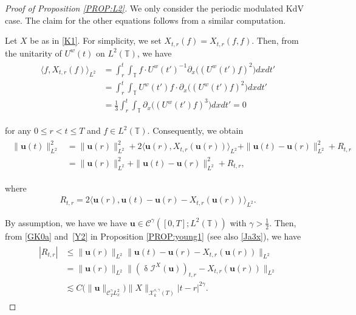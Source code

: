 \documentclass[letterpaper, 11pt,  reqno]{amsart}
\newcommand{\1}{\hspace{0.5mm}\text{I}\hspace{0.5mm}}
\newcommand{\I}{\mathcal{I}}
\newcommand{\noi}{\noindent}
\newcommand{\T}{\mathbb{T}}
\newcommand{\CC}{\mathcal{C}}
\newcommand{\updl}{\updelta}
\newcommand{\g}{\gamma}
\newcommand{\dx}{\partial_x}
\newcommand{\les}{\lesssim}
\newcommand{\jb}[1]
{\langle #1 \rangle}
\newcommand{\cX}{\mathcal{X}}
\newcommand{\uw}{U^w}
\newcommand{\uu}{\mathbf{u}}
\numberwithin{equation}{section}
\numberwithin{theorem}{section}
\begin{document}
\begin{proof}[Proof of Proposition \ref{PROP:L2}]

We only consider the periodic modulated KdV case.
The claim for the other equations follows 
from a similar computation.


Let $X$ be as in 
\eqref{K1}.
For simplicity, we set $X_{t, r}(f) = X_{t, r}(f, f)$.
Then, 
from the unitarity of $\uw(t)$ on $L^2(\T)$, 
we have 
\begin{align}
\begin{split}
\jb{f, X_{t,r}(f)  }_{L^2}
&=\int_{r}^{t} 
\int_{\T}  f\cdot 
 \uw(t')^{-1}  
\dx \big((\uw(t') f)^2 \big) 
dx  dt'\\
&=\int_{r}^{t}
 \int_{\T}   \uw(t')  f \cdot 
  \dx \big((\uw(t') f)^2\big)   dxdt'
\\&=\frac 13 \int_{r}^{t} \int_{\T}
  \dx \big((\uw(t') f)^3\big)
   dx dt'=0
\end{split}
\label{GK0}
\end{align}


\noi
for any  $0\leq r<t\leq T$ and $f \in L^2(\T)$.
Consequently,
we obtain 
\begin{align}
\label{GK1}
\begin{aligned}
\| \uu(t) \|^2_{L^2}
&=\|  \uu(r)  \|_{L^2}^2
+2\big\langle \uu(r),X_{t,r}(\uu(r)) 
\big\rangle_{L^2}
 +  \|  \uu(t) -\uu(r)  \|^2_{L^2}+R_{t,r}\\
&=\|  \uu(r)  \|^2_{L^2} +
\|   \uu(t)-\uu(r)   \|^2_{L^2}
+R_{t,r},
\end{aligned}
\end{align}



\noi
where 
\begin{align*}
R_{t,r}=2\big\langle 
\uu(r) ,  \uu(t)-  \uu(r) -X_{t,r}(\uu(r))\big\rangle_{L^2}. 
\end{align*}


\noi
By assumption, we have 
we have 
 $\uu\in \CC^\g([0, T];  L^2(\T))$
with $\g>\frac 12$. 
Then, 
from \eqref{GK0a} and~\eqref{Y2} in Proposition \ref{PROP:young1}
(see also \eqref{Ja3x}), 
we have 
\begin{align}
\begin{split}
|R_{t,r}| 
&\leq 
\|\uu(r)\|_{L^2}
\|\uu(t)- \uu(r) -X_{t,r}(\uu(r))\|_{L^2}
\\
&= 
\|\uu(r)\|_{L^2}
\|(\updl\I^X(\uu))_{t, r}  -X_{t,r}(\uu(r))\|_{L^2}
\\
&\les 
C\big(\|\uu\|_{\CC^\g_{T} L^2_x}\big)  \|X\|_{\cX^{s, \g}_k(T)} |t-r|^{2\g}.
\end{split}
\label{GK2}
\end{align}




\end{proof}
\end{document}
